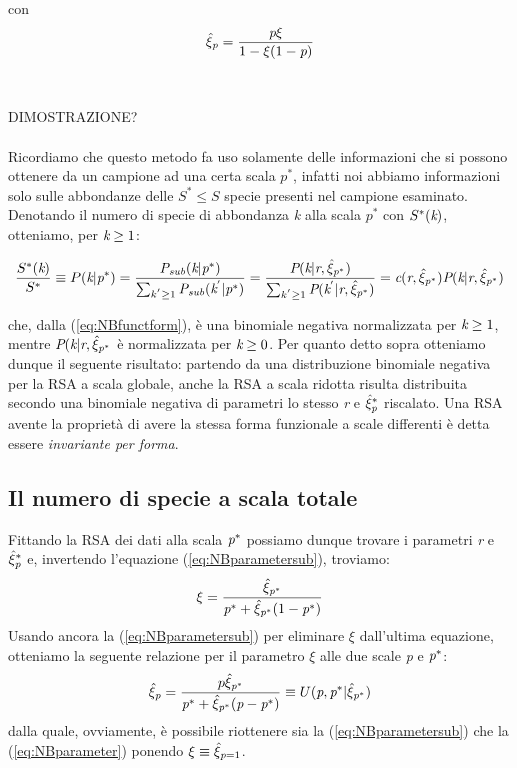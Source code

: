 con 
\begin{equation}
    \hat\xi_{\emph{p}}=\frac{\emph{p}\xi}{1-\xi(1-\emph{p})}
\label{eq:NBparametersub}
\end{equation}
\\ \\
DIMOSTRAZIONE?\\
\\
Ricordiamo che questo metodo fa uso solamente delle informazioni che si possono ottenere da un campione ad una certa scala $p^*$, infatti noi abbiamo informazioni solo sulle abbondanze delle $S^*\le S$ specie presenti nel campione esaminato. Denotando il numero di specie di abbondanza \emph{k} alla scala $p^*$ con $S^*(\emph{k})$, otteniamo, per $\emph{k}\ge 1$:

\begin{equation}
    \frac{S^*(\emph{k})}{S^*}\equiv P(\emph{k}|\emph{p}^*)=\frac{\emph{P}_\emph{sub}(\emph{k}|\emph{p}^*)}{\sum_{k^{'} \ge 1}^{} \emph{P}_\emph{sub}(\emph{k}^{'}|\emph{p}^{*})}
    =\frac{\emph{P}(\emph{k}|\emph{r},\hat\xi_{\emph{p}^*})}{\sum_{k^{'} \ge 1}^{} \emph{P}(\emph{k}^{'}|\emph{r},\hat \xi_{\emph{p}^*})}
    =\emph{c}(\emph{r},\hat\xi_{\emph{p}^*})\emph{P}(\emph{k}|\emph{r},\hat \xi_{\emph{p}^*})
    \label{eq:SstarRSA}
\end{equation}

che, dalla (\ref{eq:NBfunctform}), è una binomiale negativa normalizzata per $\emph{k}\ge 1$, mentre $\emph{P}(\emph{k}|\emph{r},\hat \xi_{\emph{p}^*}$ è normalizzata per $\emph{k}\ge 0$.
Per quanto detto sopra otteniamo dunque il seguente risultato: partendo da una distribuzione binomiale negativa per la RSA a scala globale, anche la RSA a scala ridotta risulta distribuita secondo una binomiale negativa di parametri lo stesso \emph{r} e $\hat \xi_\emph{p}^*$ riscalato.
Una RSA avente la proprietà di avere la stessa forma funzionale a scale differenti è detta essere \emph{invariante per forma}.

\subsection{Il numero di specie a scala totale}
Fittando la RSA dei dati alla scala $\emph{p}^*$ possiamo dunque trovare i parametri \emph{r} e $\hat \xi_\emph{p}^*$ e, invertendo l'equazione (\ref{eq:NBparametersub}), troviamo:
\begin{equation}
    \xi=\frac{\hat \xi_{\emph{p}^*}}{\emph{p}^*+\hat \xi_{\emph{p}^*}(1-\emph{p}^*)}
\label{eq:NBparameter}
\end{equation}
Usando ancora la (\ref{eq:NBparametersub}) per eliminare $\xi$ dall'ultima equazione, otteniamo la seguente relazione per il parametro $\xi$ alle due scale \emph{p} e $\emph{p}^*$:
\begin{equation}
    \hat\xi_\emph{p}=\frac{p \hat \xi_{\emph{p}^*}}{\emph{p}^*+\hat\xi_{\emph{p}^*}(\emph{p}-\emph{p}^*)}\equiv U(\emph{p},\emph{p}^*|\hat \xi_{\emph{p}^*})
    \label{eq:xihatp}
\end{equation}
dalla quale, ovviamente, è possibile riottenere sia la (\ref{eq:NBparametersub}) che la (\ref{eq:NBparameter}) ponendo $\xi \equiv \hat \xi_{\emph{p}=1} $.

